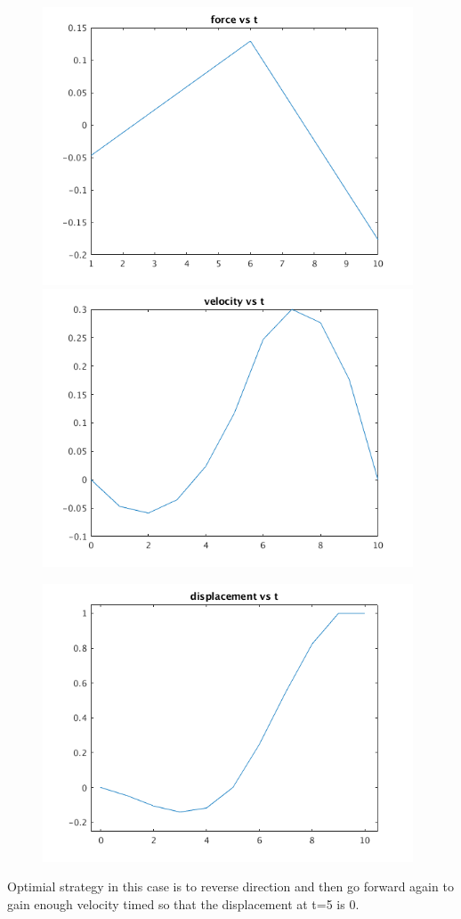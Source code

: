 \documentclass[12pt,letter]{article}
\begin{document}
\begin{enumerate}
\begin{itemize}
    \begin{figure}[H]
      \centering
      \includegraphics[width=11cm]{q9/part_b_plot_1.png}
      \includegraphics[width=11cm]{q9/part_b_plot_2.png}
    \end{figure}
    \begin{figure}[H]
      \centering
      \includegraphics[width=11cm]{q9/part_b_plot_3.png}
    \end{figure}
    Optimial strategy in this case is to reverse direction and then go forward again to gain enough velocity timed so that the displacement at t=5 is 0.
  \end{itemize}
\end{enumerate}
\end{document}
